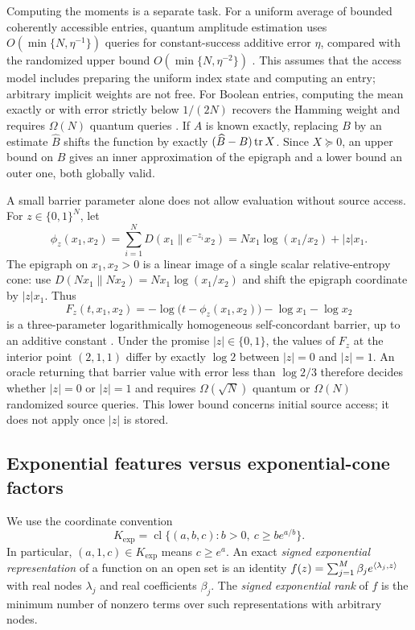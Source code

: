 Computing the moments is a separate task. For a uniform average of
bounded coherently accessible entries, quantum amplitude estimation
uses $O(\min\{N,\eta^{-1}\})$ queries for constant-success additive
error $\eta$, compared with the randomized upper bound
$O(\min\{N,\eta^{-2}\})$ \cite{BHMT2002}. This assumes that the access
model includes preparing the uniform index state and computing an entry;
arbitrary implicit weights are not free. For Boolean entries, computing
the mean exactly or with error strictly below $1/(2N)$ recovers the
Hamming weight and requires $\Omega(N)$ quantum
queries \cite{NayakWu1999}. If $A$ is known exactly, replacing $B$ by
an estimate $\widehat B$ shifts the function by exactly
$(\widehat B-B)\operatorname{tr} X$. Since $X\succeq0$, an upper bound on $B$ gives an
inner approximation of the epigraph and a lower bound an outer one,
both globally valid.

A small barrier parameter alone does not allow evaluation without
source access.
For $z\in\{0,1\}^N$, let
\[
 \phi_z(x_1,x_2)=\sum_{i=1}^N
        D(x_1\|e^{-z_i}x_2)
       =N x_1\log(x_1/x_2)+|z|x_1.
\]
The epigraph on $x_1,x_2>0$ is a linear image of a single scalar
relative-entropy cone: use
$D(Nx_1\|Nx_2)=N x_1\log(x_1/x_2)$ and shift the epigraph coordinate
by $|z|x_1$. Thus
\[
 F_z(t,x_1,x_2)=-\log\bigl(t-\phi_z(x_1,x_2)\bigr)
                      -\log x_1-\log x_2
\]
is a three-parameter logarithmically homogeneous self-concordant barrier,
up to an additive constant \cite{FS2023}. Under the promise $|z|\in\{0,1\}$,
the values of $F_z$ at the interior point $(2,1,1)$ differ by exactly
$\log2$ between $|z|=0$ and $|z|=1$. An oracle returning that
barrier value with error less than $\log2/3$ therefore decides
whether $|z|=0$ or $|z|=1$ and requires $\Omega(\sqrt N)$
quantum or $\Omega(N)$ randomized source queries. This lower bound
concerns initial source access; it does not apply once $|z|$ is stored.

\subsection{Exponential features versus exponential-cone factors}

We use the coordinate convention
\[
 K_{\exp}=\operatorname{cl}\{(a,b,c): b>0,\ c\geq b e^{a/b}\}.
\]
In particular, $(a,1,c)\in K_{\exp}$ means $c\geq e^a$. An exact
\emph{signed exponential representation} of a function on an open set is
an identity $f(z)=\sum_{j=1}^M\beta_j e^{\langle \lambda_j,z\rangle}$ with real
nodes $\lambda_j$ and real coefficients $\beta_j$. The \emph{signed
exponential rank} of $f$ is the minimum number of nonzero terms over such
representations with arbitrary nodes.

